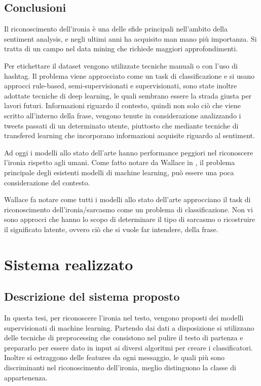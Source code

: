 \documentclass[oneside]{book}
\begin{document}
\section{Conclusioni}
Il riconoscimento dell'ironia è una delle sfide principali nell'ambito della sentiment analysis, e negli ultimi anni ha acquisito man mano più importanza. Si tratta di un campo nel data mining che richiede maggiori approfondimenti.

Per etichettare il dataset vengono utilizzate tecniche manuali o con l'uso di hashtag. Il problema viene approcciato come un task di classificazione e si usano approcci rule-based, semi-supervisionati e supervisionati, sono state inoltre adottate tecniche di deep learning, le quali sembrano essere la strada giusta per lavori futuri. Informazioni riguardo il contesto, quindi non solo ciò che viene scritto all'interno della frase,  vengono tenute in considerazione analizzando i tweets passati di un determinato utente, piuttosto che mediante tecniche di transfered learning che incorporano informazioni acquisite riguardo al sentiment.

Ad oggi i modelli allo stato dell'arte hanno performance peggiori nel riconoscere l'ironia rispetto agli umani. Come fatto notare da Wallace in \cite{survey4}, il problema principale degli esistenti modelli di machine learning, può essere una poca considerazione del contesto.

Wallace fa notare come tutti i modelli allo stato dell'arte approcciano il task di riconoscimento dell'ironia/sarcasmo come un problema di classificazione. Non vi sono approcci che hanno lo scopo di determinare il tipo di sarcasmo o ricostruire il significato latente, ovvero ciò che si vuole far intendere, della frase.

\chapter{Sistema realizzato}

\section{Descrizione del sistema proposto}
In questa tesi, per riconoscere l'ironia nel testo, vengono proposti dei modelli supervisionati di machine learning.
Partendo dai dati a disposizione si utilizzano delle tecniche di preprocessing che consistono nel pulire il testo di partenza e prepararlo per essere dato in input ai diversi algoritmi per creare i classificatori. Inoltre si estraggono delle features da ogni messaggio, le quali più sono discriminanti nel riconoscimento dell'ironia, meglio distinguono la classe di appartenenza.
\end{document}
